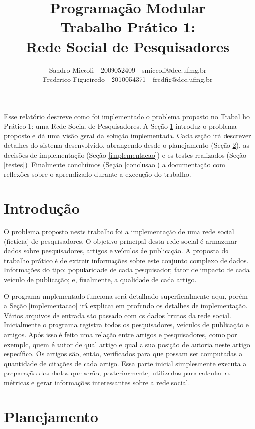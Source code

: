 \documentclass[12pt]{article}
\title{Programação Modular \\ Trabalho Prático 1: \\ Rede Social de Pesquisadores}
\author{Sandro Miccoli - 2009052409 - smiccoli@dcc.ufmg.br\\
		Frederico Figueiredo - 2010054371 - fredfig@dcc.ufmg.br}
\begin{document}
\maketitle


\begin{resumo}
Esse relatório descreve como foi implementado o problema proposto no Trabal	ho Prático 1: uma Rede Social de Pesquisadores. A Seção \ref{introducao} introduz o problema proposto e dá uma visão geral da solução implementada. Cada seção irá descrever detalhes do sistema desenvolvido, abrangendo desde o planejamento (Seção \ref{planejamento}), as decisões de implementação (Seção \ref{implementacao}) e os testes realizados (Seção \ref{testes}). Finalmente concluímos (Seção \ref{conclusao}) a documentação com reflexões sobre o aprendizado durante a execução do trabalho.
\end{resumo}

\section{Introdução}
\label{introducao}

O problema proposto neste trabalho foi a implementação de uma rede social (fictícia) de pesquisadores. O objetivo principal desta rede social é armazenar dados sobre pesquisadores, artigos e veículos de publicação.
A proposta do trabalho prático é de extrair informações sobre este conjunto complexo de dados. Informações do tipo: popularidade de cada pesquisador; fator de impacto de cada veículo de publicação; e, finalmente, a qualidade de cada artigo.

O programa implementado funciona será detalhado superficialmente aqui, porém a Seção \ref{implementacao} irá explicar em profundo os detalhes de implementação. Vários arquivos de entrada são passado com os dados brutos da rede social. Inicialmente o programa registra todos os pesquisadores, veículos de publicação e artigos. Após isso é feito uma relação entre artigos e pesquisadores, como por exemplo, quem é autor de qual artigo e qual a sua posição de autoria neste artigo específico. Os artigos são, então, verificados para que possam ser computadas a quantidade de citações de cada artigo. Essa parte inicial simplesmente executa a preparação dos dados que serão, posteriormente, utilizados para calcular as métricas e gerar informações interessantes sobre a rede social.

\section{Planejamento}
\label{planejamento}
\end{document}
